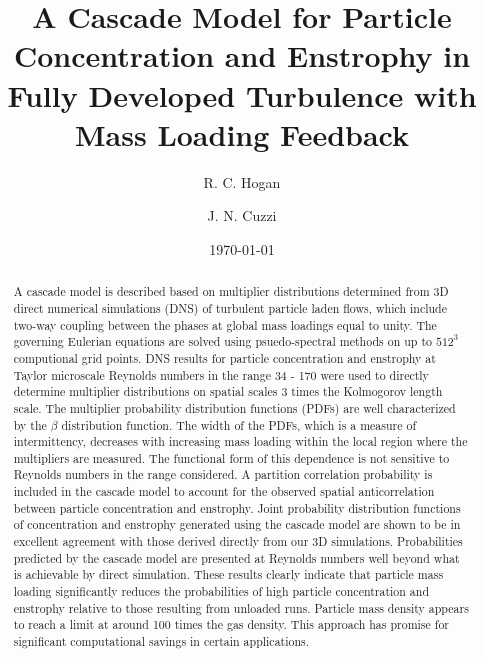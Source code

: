 \documentclass[aps,pra,twocolumn,groupedaddress,showkeys,showpacs,floatfix]{revtex4}
\begin{document}
\title{A Cascade Model for Particle Concentration 
and Enstrophy in Fully Developed Turbulence with Mass Loading Feedback}
\author{R. C. Hogan}  
\author{J. N. Cuzzi}  
\date{\today}

\begin{abstract}
A cascade model is described based on multiplier distributions determined from
3D direct numerical simulations (DNS) of turbulent particle laden flows, which
include two-way coupling between the phases at global mass loadings equal to
unity. The governing Eulerian equations are solved using psuedo-spectral
methods on up to $512^3$ computional grid points. DNS results for particle
concentration and enstrophy at Taylor microscale Reynolds numbers in the range
34 - 170 were used to directly determine multiplier distributions on spatial
scales 3 times the Kolmogorov length scale. The multiplier probability
distribution functions (PDFs) are well characterized by the $\beta$
distribution function. The width of the PDFs, which is a measure of
intermittency, decreases with increasing mass loading within the local region
where the multipliers are measured. The functional form of this dependence is
not sensitive to Reynolds numbers in the range considered. A partition correlation
probability is included in the cascade model to account for the observed
spatial anticorrelation between particle concentration and enstrophy. Joint
probability distribution functions of concentration and enstrophy generated
using the cascade model are shown to be in excellent agreement with those
derived directly from our 3D simulations. Probabilities predicted by the
cascade model are presented at Reynolds numbers well beyond what is achievable by direct
simulation. These results clearly indicate that particle mass
loading significantly reduces the probabilities of high particle concentration
and enstrophy relative to those resulting from unloaded runs. Particle mass
density appears to reach a limit at around 100 times the gas density.
This approach has promise for significant computational savings in certain applications.
\end{abstract}

  

\maketitle
\end{document}
